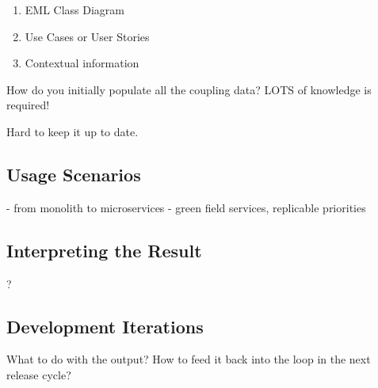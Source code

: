 \begin{enumerate}
\item EML Class Diagram
\item Use Cases or User Stories
\item Contextual information
\end{enumerate}


How do you initially populate all the coupling data? LOTS of knowledge is required!

Hard to keep it up to date.


\subsection{Usage Scenarios}


- from monolith to microservices
- green field services, replicable priorities

\subsection{Interpreting the Result}

?

\subsection{Development Iterations}

What to do with the output? How to feed it back into the loop in the next release cycle?
